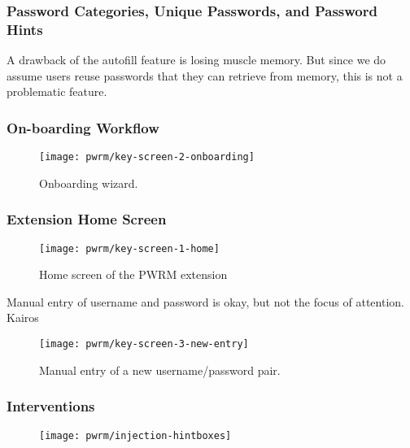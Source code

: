 \subsubsection{Password Categories, Unique Passwords, and Password Hints}
A drawback of the autofill feature is losing muscle memory. But since we do assume users reuse passwords that they can retrieve from memory, this is not a problematic feature. 

\subsubsection{On-boarding Workflow}




\begin{figure}[htbp]
	\centering
	\texttt{[image: pwrm/key-screen-2-onboarding]}
	\caption{\label{fig:pwrm:key-screen-onboarding} Onboarding wizard.}
\end{figure}

\subsubsection{Extension Home Screen}

\begin{figure}[htbp]
	\centering
	\texttt{[image: pwrm/key-screen-1-home]}
	\caption{\label{fig:pwrm:key-screen-home} Home screen of the PWRM extension}
\end{figure}

Manual entry of username and password is okay, but not the focus of attention. Kairos 
\begin{figure}[htbp]
	\centering
	\texttt{[image: pwrm/key-screen-3-new-entry]}
	\caption{\label{fig:pwrm:key-screen-entry} Manual entry of a new username/password pair. }
\end{figure}

\subsubsection{Interventions}
\begin{figure}[htbp]
	\centering
	\texttt{[image: pwrm/injection-hintboxes]}
	\caption{\label{fig:pwrm:injection-hintboxes} }
\end{figure}


